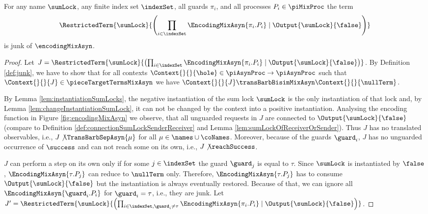 \documentclass[]{llncs}
\begin{document}
\begin{lemma} \label{lem:junkRemainsOfSumsMixAsyn}
	For any name $ \sumLock $, any finite index set $ \indexSet $, all guards $ \pi_i $, and all processes $ P_i \in \piMixProc $ the term
	\begin{align*}
		\RestrictedTerm{\sumLock}{\left( \prod_{i \in \indexSet} \EncodingMixAsyn{\pi_i.P_i} \mid \Output{\sumLock}{\false} \right)}
	\end{align*}
	is junk of $ \encodingMixAsyn $.
\end{lemma}

\begin{proof}
	Let $ J = \RestrictedTerm{\sumLock}{\left( \prod_{i \in \indexSet} \EncodingMixAsyn{\pi_i.P_i} \mid \Output{\sumLock}{\false} \right)} $. By Definition \ref{def:junk}, we have to show that for all contexts $ \Context{}{}{\hole} \in \piAsynProc \to \piAsynProc $ such that $ \Context{}{}{J} \in \pieceTargetTermsMixAsyn $ we have $ \Context{}{}{J} \transBarbBisimMixAsyn \Context{}{}{\nullTerm} $.
	
	By Lemma \ref{lem:instantiationSumLocks}, the negative instantiation of the sum lock $ \sumLock $ is the only instantiation of that lock and, by Lemma \ref{lem:changeInstantiationSumLock}, it can not be changed by the context into a positive instantiation. Analysing the encoding function in Figure \ref{fig:encodingMixAsyn} we observe, that all unguarded requests in $ J $ are connected to $ \Output{\sumLock}{\false} $ (compare to Definition \ref{def:connectionSumLockSenderReceiver} and Lemma \ref{lem:sumLockOfReceiverOrSender}). Thus $ J $ has no translated observables, i.e., $ J\not\TransBarbSepAsyn{\mu} $ for all $ \mu \in \names \cup \coNames $. Moreover, because of the guards $ \guard_i $, $ J $ has no unguarded occurrence of $ \success $ and can not reach some on its own, i.e., $ J\not\reachSuccess $.
	
	$ J $ can perform a step on its own only if for some $ j \in \indexSet $ the guard $ \guard_j $ is equal to $ \tau $. Since $ \sumLock $ is instantiated by $ \false $, $ \EncodingMixAsyn{\tau.P_j} $ can reduce to $ \nullTerm $ only. Therefore, $ \EncodingMixAsyn{\tau.P_j} $ has to consume $ \Output{\sumLock}{\false} $ but the instantiation is always eventually restored. Because of that, we can ignore all $ \EncodingMixAsyn{\guard_i.P_i} $ for $ \guard_i = \tau $, i.e., they are junk. Let $ J' = \RestrictedTerm{\sumLock}{\left( \prod_{i \in \indexSet, \guard_i \neq \tau} \EncodingMixAsyn{\pi_i.P_i} \mid \Output{\sumLock}{\false} \right)} $.
	

\end{proof}
\end{document}
